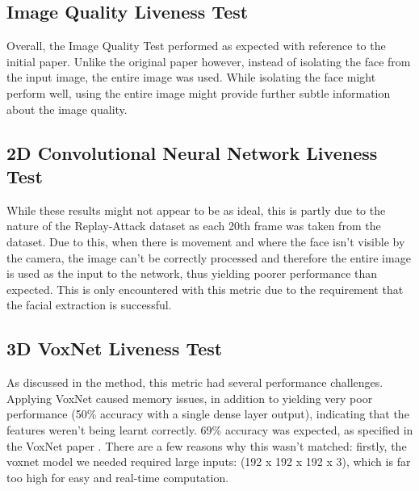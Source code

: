 \documentclass[10pt,a4paper]{article}
\begin{document}
    \subsection{Image Quality Liveness Test}
        Overall, the Image Quality Test performed as expected with reference to the initial paper. Unlike the original paper however, instead of isolating the face
        from the input image, the entire image was used. While isolating the face might perform well, using the entire image might provide further subtle information
        about the image quality.



    \subsection{2D Convolutional Neural Network Liveness Test}
        \todo{}

        While these results might not appear to be as ideal, this is partly due to the nature of the Replay-Attack dataset as each 20th frame was taken from the dataset.
        Due to this, when there is movement and where the face isn't visible by the camera, the image can't be correctly processed and therefore the entire image is used
        as the input to the network, thus yielding poorer performance than expected. This is only encountered with this metric due to the requirement that the facial extraction is successful. 
        
    \subsection{3D VoxNet Liveness Test}
            As discussed in the method, this metric had several performance challenges. Applying VoxNet caused memory issues, in addition to yielding very poor performance
            (50\% accuracy with a single dense layer output), indicating that the features weren't being learnt correctly. 69\% accuracy was expected, as specified in the
            VoxNet paper \cite{VoxNetModel}. There are a few reasons why this wasn't matched: firstly, the voxnet model we needed required large inputs: (192 x 192 x 192 x 3),
            which is far too high for easy and real-time computation. 
\end{document}
